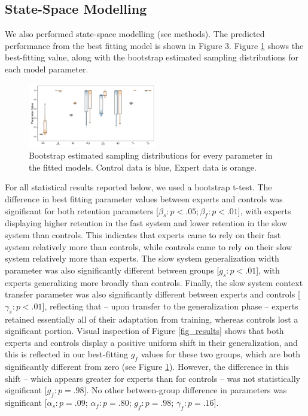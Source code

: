 \documentclass[jou, 11pt, longtable, floatsintext, notab]{apa6}
\begin{document}
\subsection{State-Space Modelling}
We also performed state-space modelling (see methods). The
predicted performance from the best fitting model is shown
in Figure 3. Figure \ref{fig_params} shows the best-fitting
value, along with the bootstrap estimated sampling
distributions for each model parameter.
\begin{figure}[h]
  \centering
  \includegraphics[width=0.5\textwidth]{figures/fig_params.pdf}
  \caption{\scriptsize
    Bootstrap estimated sampling distributions for every
    parameter in the fitted models. Control data is blue, Expert
    data is orange.
  }
  \label{fig_params}
\end{figure}
For all statistical results reported below, we used a
bootstrap t-test. The difference in best fitting parameter
values between experts and controls was significant for both
retention parameters [$\beta_s: p<.05; \beta_f: p<.01$],
with experts displaying higher retention in the fast system
and lower retention in the slow system than controls. This
indicates that experts came to rely on their fast system
relatively more than controls, while controls came to rely
on their slow system relatively more than experts. The slow
system generalization width parameter was also significantly
different between groups [$g_s: p<.01$], with experts
generalizing more broadly than controls. Finally, the slow
system context transfer parameter was also significantly
different between experts and controls [$\gamma_s: p <
.01$], reflecting that -- upon transfer to the
generalization phase -- experts retained essentially all of
their adaptation from training, whereas controls lost a
significant portion. Visual inspection of Figure
\ref{fig_results} shows that both experts and controls
display a positive uniform shift in their generalization,
and this is reflected in our best-fitting $g_f$ values for
these two groups, which are both significantly different
from zero (see Figure \ref{fig_params}). However, the
difference in this shift -- which appears greater for
experts than for controls -- was not statistically
significant [$g_f: p=.98$]. No other between-group
difference in parameters was significant [$\alpha_s: p=.09$;
$\alpha_f: p=.80$; $g_f: p=.98$; $\gamma_f: p=.16$].
\end{document}
